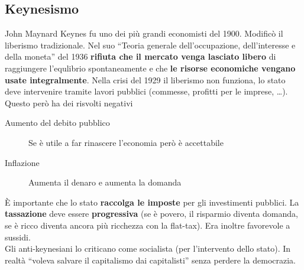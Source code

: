 \subsection{Keynesismo}
John Maynard Keynes fu uno dei più grandi economisti del 1900. Modificò il liberismo tradizionale.
Nel suo ``Teoria generale dell'occupazione, dell'interesse e della moneta'' del 1936 \textbf{rifiuta
che il mercato venga lasciato libero} di raggiungere l'equlibrio spontaneamente e che \textbf{le 
risorse economiche vengano usate integralmente}. Nella crisi del 1929 il liberismo non funziona,
lo stato deve intervenire tramite lavori pubblici (commesse, profitti per le imprese, \ldots). Questo
però ha dei risvolti negativi
\begin{description}
  \item[Aumento del debito pubblico] Se è utile a far rinascere l'economia però è accettabile
  \item[Inflazione] Aumenta il denaro e aumenta la domanda
\end{description}
È importante che lo stato \textbf{raccolga le imposte} per gli investimenti pubblici. La 
\textbf{tassazione} deve essere \textbf{progressiva} (se è povero, il risparmio diventa domanda,
se è ricco diventa ancora più ricchezza con la flat-tax). Era inoltre favorevole a sussidi.\\
Gli anti-keynesiani lo criticano come socialista (per l'intervento dello stato). In realtà
``voleva salvare il capitalismo dai capitalisti'' senza perdere la democrazia.


